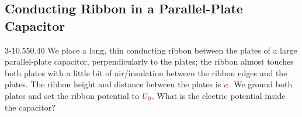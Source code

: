 \documentclass[11pt, a4paper]{article}
\newcommand{\dmath}[1]{\textcolor{Maroon}{#1}}  %
\newcommand{\defaultQuestionWidth}{0.55}
\newcommand{\defaultGraphicsWidth}{0.40}
\begin{document}
\subsection{Conducting Ribbon in a Parallel-Plate Capacitor}
\begin{figurequestion}{3-1}{\defaultQuestionWidth}{\defaultGraphicsWidth}
    We place a long, thin conducting ribbon between the plates of a large parallel-plate capacitor, perpendicularly to the plates; the ribbon almost touches both plates with a little bit of air/insulation between the ribbon edges and the plates. The ribbon height and distance between the plates is $ \dmath{a} $. We ground both plates and set the ribbon potential to $ \dmath{U_{0}} $. What is the electric potential inside the capacitor?
\end{figurequestion}
\end{document}
